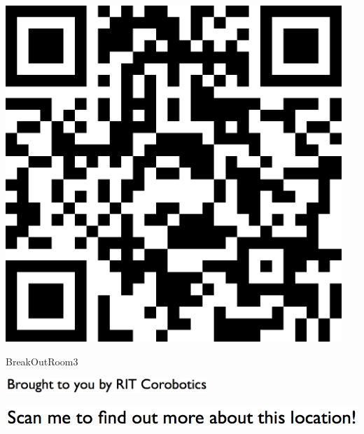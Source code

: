 \documentclass[letterpaper]{article}
\begin{document}
 \begingroup 
 \centerline{\includegraphics[scale=1,width=5in,height=5in]{BreakOutRoom3.png}} 
 \endgroup 
 \vspace*{\fill} 

 \hfill{\small BreakOutRoom3} 

  \vspace{0.7in} 
 
 \centerline{\includegraphics[scale=1,width=3in]{text-bottom.png}} 
 
 \pagebreak 
{} 
 \vspace*{\fill} 
 
  \centerline{\includegraphics[scale=1,width=6in]{text-top.png}} 
 
 \vspace{0.5in} 
 
\end{document}
